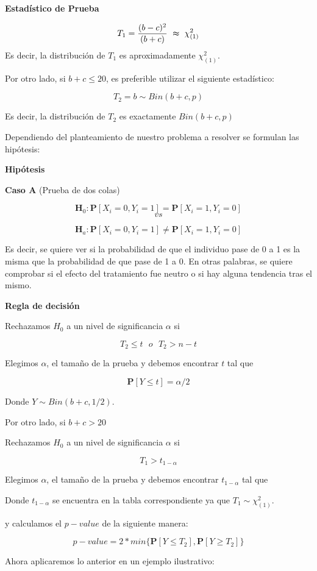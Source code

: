 \documentclass[
  a4paper,
  oneside,
  openany]{book}
\begin{document}
\textbf{Estadístico de Prueba}

\[T_{1}=\frac{(b-c)^2}{(b+c)} \ \thickapprox \ \chi^{2}_{(1)}\]
Es decir, la distribución de \(T_{1}\) es aproximadamente \(\chi^{2}_{(1)}\).

Por otro lado, si \(b+c\leq20\), es preferible utilizar el siguiente estadístico:

\[T_{2}=b\sim Bin(b+c,p)\]

Es decir, la distribución de \(T_{2}\) es exactamente \(Bin(b+c,p)\)

Dependiendo del planteamiento de nuestro problema a resolver se formulan las hipótesis:

\textbf{Hipótesis}

\textbf{Caso A} (Prueba de dos colas)

\[\textbf{H}_0: \mathbf{P}[X_{i}=0,Y_{i}=1]= \mathbf{P}[X_{i}=1,Y_{i}=0]\]
\[vs\]

\[\textbf{H}_a: \mathbf{P}[X_{i}=0,Y_{i}=1]\neq \mathbf{P}[X_{i}=1,Y_{i}=0]\]

Es decir, se quiere ver si la probabilidad de que el individuo pase de 0 a 1 es la misma que la probabilidad de que pase de 1 a 0. En otras palabras, se quiere comprobar si el efecto del tratamiento fue neutro o si hay alguna tendencia tras el mismo.

\textbf{Regla de decisión}

Rechazamos \(H_0\) a un nivel de significancia \(\alpha\) si

\[T_{2} \leq t \ \ \   o \ \ \ T_{2}>n-t\]

Elegimos \(\alpha\), el tamaño de la prueba y debemos encontrar \(t\) tal que

\[\mathbf{P}[Y \leq t]=\alpha/2\]

Donde \(Y \sim Bin (b+c,1/2)\).

Por otro lado, si \(b+c>20\)

Rechazamos \(H_0\) a un nivel de significancia \(\alpha\) si

\[T_{1} > t_{1-\alpha}\]

Elegimos \(\alpha\), el tamaño de la prueba y debemos encontrar \(t_{1-\alpha}\) tal que

Donde \(t_{1-\alpha}\) se encuentra en la tabla correspondiente ya que \(T_{1} \sim \chi^{2}_{(1)}\).

y calculamos el \(p-value\) de la siguiente manera:

\[p-value=2*min\{\mathbf{P}[Y\leq T_{2}],\mathbf{P}[Y\geq T_{2}]\}\]

Ahora aplicaremos lo anterior en un ejemplo ilustrativo:
\end{document}
